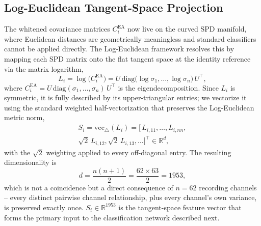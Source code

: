 \documentclass[journal]{IEEEtran}
\begin{document}
\subsection{Log-Euclidean Tangent-Space Projection}
\label{sec:tangent}
The whitened covariance matrices $C_i^{\mathrm{EA}}$ now live on the curved SPD manifold, where Euclidean distances are geometrically meaningless and standard classifiers cannot be applied directly. The Log-Euclidean framework \cite{pennec2006riemannian,barachant2013classification} resolves this by mapping each SPD matrix onto the flat tangent space at the identity reference via the matrix logarithm,
\begin{equation}
L_i = \log\!\big(C_i^{\mathrm{EA}}\big) = U \, \mathrm{diag}\big(\log \sigma_1, \ldots, \log \sigma_n\big) \, U^{\top},
\label{eq:matrix_log}
\end{equation}
where $C_i^{\mathrm{EA}} = U \, \mathrm{diag}(\sigma_1, \ldots, \sigma_n) \, U^{\top}$ is the eigendecomposition. Since $L_i$ is symmetric, it is fully described by its upper-triangular entries; we vectorize it using the standard weighted half-vectorization that preserves the Log-Euclidean metric norm,
\begin{multline}
S_i = \mathrm{vec}_{\triangle}(L_i) = \big[\, L_{i,11}, \ldots, L_{i,nn}, \\ \sqrt{2}\,L_{i,12}, \sqrt{2}\,L_{i,13}, \ldots \big]^{\top} \in \mathbb{R}^{d},
\label{eq:tangent_vec}
\end{multline}
with the $\sqrt{2}$ weighting applied to every off-diagonal entry. The resulting dimensionality is
\begin{equation}
d = \frac{n(n+1)}{2} = \frac{62 \times 63}{2} = 1953,
\label{eq:tangent_dim}
\end{equation}
which is not a coincidence but a direct consequence of $n = 62$ recording channels -- every distinct pairwise channel relationship, plus every channel's own variance, is preserved exactly once. $S_i \in \mathbb{R}^{1953}$ is the tangent-space feature vector that forms the primary input to the classification network described next.
\end{document}
